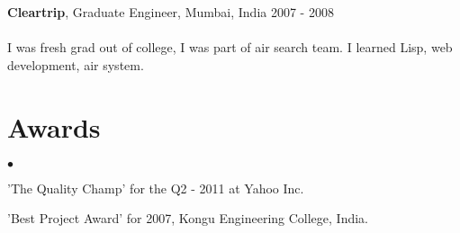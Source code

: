 \documentclass[margin, line, 10pt]{res}
\newenvironment{list2}{
  \begin{list}{$\bullet$}{%
      \setlength{\itemsep}{0in}
      \setlength{\parsep}{0in} \setlength{\parskip}{0in}
      \setlength{\topsep}{0in} \setlength{\partopsep}{0in}
      \setlength{\leftmargin}{0.2in}}}{\end{list}}
\begin{document}
\begin{resume}
\section{}
{\Large {\bf Cleartrip}}, Graduate Engineer,  Mumbai, India \hfill 2007 - 2008\\
\vspace{-.3cm}\\
I was fresh grad out of college, I was part of air search team. I learned Lisp, web development, air system.
\vspace{.05cm}



\section{Awards}
\begin{list2}
\item 'The Quality Champ' for the Q2 - 2011 at Yahoo Inc.
\item 'Best Project Award' for 2007, Kongu Engineering College, India.
\end{list2}

\end{resume}
\end{document}
